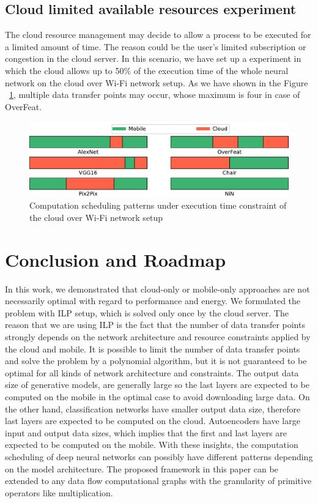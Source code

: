 \documentclass[conference,9pt]{IEEEtran}
\begin{document}
\subsection{Cloud limited available resources experiment}
The cloud resource management may decide to allow a process to be executed for a limited amount of time. The reason could be the user's limited subscription or congestion in the cloud server. In this scenario, we have set up a experiment in which the cloud allows up to 50\% of the execution time of the whole neural network on the cloud over Wi-Fi network setup. As we have shown in the Figure ~\ref{constraints_effect}, multiple data transfer points may occur, whose maximum is four in case of OverFeat.
\begin{figure}[htbp]
\centerline{\includegraphics[width=\columnwidth]{constraints_effect.pdf}}
\caption{Computation scheduling patterns under execution time constraint of the cloud over Wi-Fi network setup}
\label{constraints_effect}
\end{figure}
\section*{Conclusion and Roadmap}
In this work, we demonstrated that cloud-only or mobile-only approaches are not necessarily optimal with regard to performance and energy. We formulated the problem with ILP setup, which is solved only once by the cloud server. The reason that we are using ILP is the fact that the number of data transfer points strongly depends on the network architecture and resource constraints applied by the cloud and mobile. It is possible to limit the number of data transfer points and solve the problem by a polynomial algorithm, but it is not guaranteed to be optimal for all kinds of network architecture and constraints.
The output data size of generative models, are generally large so the last layers are expected to be computed on the mobile in the optimal case to avoid downloading large data. On the other hand, classification networks have smaller output data size, therefore last layers are expected to be computed on the cloud. Autoencoders have large input and output data sizes, which implies that the first and last layers are expected to be computed on the mobile. With these insights, the computation scheduling of deep neural networks can possibly have different patterns depending on the model architecture. The proposed framework in this paper can be extended to any data flow computational graphs with the granularity of primitive operators like multiplication.
\end{document}
